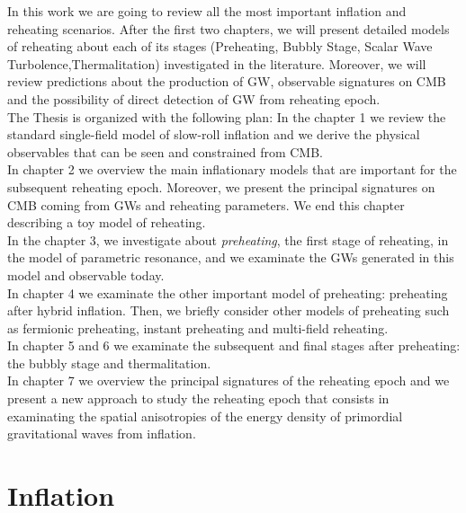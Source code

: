\documentclass[11pt,a4paper,twoside]{book}
\begin{document}
In this work we are going to review all the most important inflation and reheating scenarios. After the first two chapters, we will present detailed models of reheating about each of its stages (Preheating, Bubbly Stage, Scalar Wave Turbolence,Thermalitation) investigated in the literature. Moreover, we will review predictions about the production of GW, observable signatures on CMB and the possibility of direct detection of GW from reheating epoch.\\
The Thesis is organized with the following plan:
In the chapter 1 we review the standard single-field model of slow-roll inflation and we derive the physical observables that can be seen and constrained from CMB. \\
In chapter 2 we overview the main inflationary models that are important for the subsequent reheating epoch. Moreover, we present the principal signatures on CMB coming from GWs and reheating parameters. We end this chapter describing a toy model of reheating.\\
In the chapter 3, we investigate about \textit{preheating}, the first stage of reheating, in the model of parametric resonance, and we examinate the GWs generated in this model and observable today. \\
In  chapter 4 we examinate the other important model of preheating: preheating after hybrid inflation. Then, we briefly consider other models of preheating such as fermionic preheating, instant preheating and multi-field reheating.\\
In  chapter 5 and 6 we examinate the subsequent and final stages after preheating: the bubbly stage and thermalitation.\\
In chapter 7 we  overview the principal signatures  of the reheating epoch and we present a new approach to study the reheating epoch that consists in examinating the spatial anisotropies of the energy density of primordial gravitational waves from inflation. 
 
 \mainmatter
 
\chapter{Inflation}
\end{document}
